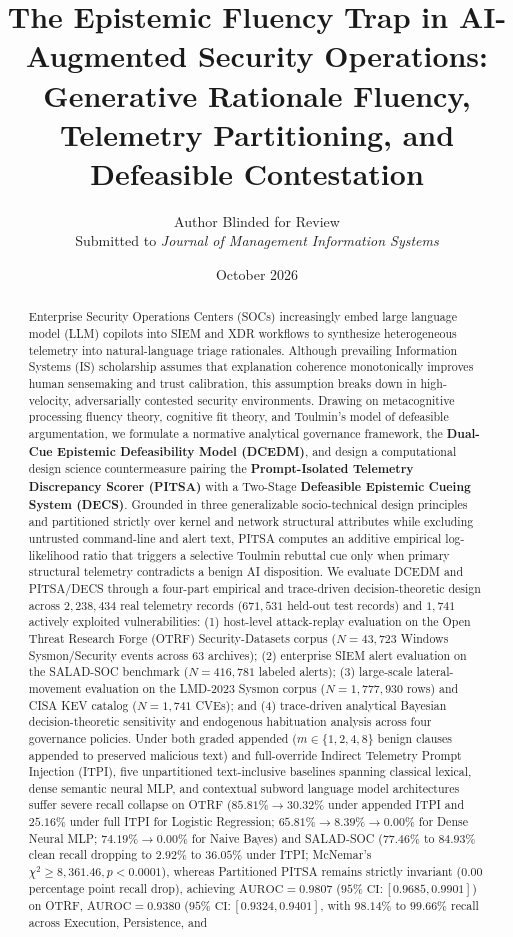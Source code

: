 \documentclass[11pt,a4paper]{article}
\title{\textbf{The Epistemic Fluency Trap in AI-Augmented Security Operations: Generative Rationale Fluency, Telemetry Partitioning, and Defeasible Contestation}}
\author{
  Author Blinded for Review\\
  \small Submitted to \textit{Journal of Management Information Systems}
}
\date{October 2026}
\begin{document}
\maketitle

\begin{abstract}
Enterprise Security Operations Centers (SOCs) increasingly embed large language model (LLM) copilots into SIEM and XDR workflows to synthesize heterogeneous telemetry into natural-language triage rationales. Although prevailing Information Systems (IS) scholarship assumes that explanation coherence monotonically improves human sensemaking and trust calibration, this assumption breaks down in high-velocity, adversarially contested security environments. Drawing on metacognitive processing fluency theory, cognitive fit theory, and Toulmin's model of defeasible argumentation, we formulate a normative analytical governance framework, the \textbf{Dual-Cue Epistemic Defeasibility Model (DCEDM)}, and design a computational design science countermeasure pairing the \textbf{Prompt-Isolated Telemetry Discrepancy Scorer (PITSA)} with a Two-Stage \textbf{Defeasible Epistemic Cueing System (DECS)}. Grounded in three generalizable socio-technical design principles and partitioned strictly over kernel and network structural attributes while excluding untrusted command-line and alert text, PITSA computes an additive empirical log-likelihood ratio that triggers a selective Toulmin rebuttal cue only when primary structural telemetry contradicts a benign AI disposition. We evaluate DCEDM and PITSA/DECS through a four-part empirical and trace-driven decision-theoretic design across $2,238,434$ real telemetry records ($671,531$ held-out test records) and $1,741$ actively exploited vulnerabilities: (1) host-level attack-replay evaluation on the Open Threat Research Forge (OTRF) Security-Datasets corpus ($N = 43,723$ Windows Sysmon/Security events across 63 archives); (2) enterprise SIEM alert evaluation on the SALAD-SOC benchmark ($N = 416,781$ labeled alerts); (3) large-scale lateral-movement evaluation on the LMD-2023 Sysmon corpus ($N = 1,777,930$ rows) and CISA KEV catalog ($N = 1,741$ CVEs); and (4) trace-driven analytical Bayesian decision-theoretic sensitivity and endogenous habituation analysis across four governance policies. Under both graded appended ($m \in \{1, 2, 4, 8\}$ benign clauses appended to preserved malicious text) and full-override Indirect Telemetry Prompt Injection (ITPI), five unpartitioned text-inclusive baselines spanning classical lexical, dense semantic neural MLP, and contextual subword language model architectures suffer severe recall collapse on OTRF ($85.81\% \to 30.32\%$ under appended ITPI and $25.16\%$ under full ITPI for Logistic Regression; $65.81\% \to 8.39\% \to 0.00\%$ for Dense Neural MLP; $74.19\% \to 0.00\%$ for Naive Bayes) and SALAD-SOC ($77.46\%\text{ to }84.93\%$ clean recall dropping to $2.92\%\text{ to }36.05\%$ under ITPI; McNemar's $\chi^2 \ge 8,361.46, p < 0.0001$), whereas Partitioned PITSA remains strictly invariant ($0.00$ percentage point recall drop), achieving $\text{AUROC} = 0.9807$ ($95\%\text{ CI}: [0.9685, 0.9901]$) on OTRF, $\text{AUROC} = 0.9380$ ($95\%\text{ CI}: [0.9324, 0.9401]$, with $98.14\%$ to $99.66\%$ recall across Execution, Persistence, and 
\end{abstract}
\end{document}
